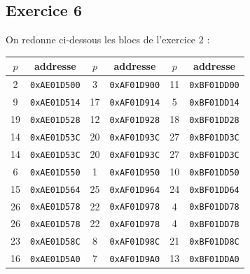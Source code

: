 \documentclass[11pt, a4 paper]{article}
\begin{document}
\subsection{Exercice 6}
On redonne ci-dessous les blocs de l'exercice 2 :\\
\begin{center}
    \begin{tabular}{| c | c || c | c || c | c |}
        \rowcolor{lightgrey}
        \hline
        $p$ & addresse & $p$ & addresse & $p$ & addresse \\
        \hline
        \hline
        \rowcolor{lightgreen}
        2 & \texttt{0xAE01D500} & 3 & \texttt{0xAF01D900} & 11 & \texttt{0xBF01DD00} \\
        \hline
        \rowcolor{lightgreen}
        9 & \texttt{0xAE01D514} & 17 & \texttt{0xAF01D914} & 5 & \texttt{0xBF01DD14} \\
        \hline
        \rowcolor{lightgreen}
        19 & \texttt{0xAE01D528} & 12 & \texttt{0xAF01D928} & 18 & \texttt{0xBF01DD28} \\
        \hline
        \rowcolor{lightgreen}
        14 & \texttt{0xAE01D53C} & 20 & \texttt{0xAF01D93C} & 27 & \texttt{0xBF01DD3C} \\
        \hline
        \hline
        \rowcolor{lightblue}
        14 & \texttt{0xAE01D53C} & 20 & \texttt{0xAF01D93C} & 27 & \texttt{0xBF01DD3C} \\
        \hline
        \rowcolor{lightblue}
        6 & \texttt{0xAE01D550} & 1 & \texttt{0xAF01D950} & 10 & \texttt{0xBF01DD50} \\
        \hline
        \rowcolor{lightblue}
        15 & \texttt{0xAE01D564} & 25 & \texttt{0xAF01D964} & 24 & \texttt{0xBF01DD64}\\
        \hline
        \rowcolor{lightblue}
        26 & \texttt{0xAE01D578} & 22 & \texttt{0xAF01D978} & 4 & \texttt{0xBF01DD78}\\
        \hline
        \hline
        \rowcolor{lightred}
        26 & \texttt{0xAE01D578} & 22 & \texttt{0xAF01D978} & 4 & \texttt{0xBF01DD78}\\
        \hline
        \rowcolor{lightred}
        23 & \texttt{0xAE01D58C} & 8 & \texttt{0xAF01D98C} & 21 & \texttt{0xBF01DD8C}\\
        \hline
        \rowcolor{lightred}
        16 & \texttt{0xAE01D5A0} & 7 & \texttt{0xAF01D9A0} & 13 & \texttt{0xBF01DDA0}\\
        \hline
    \end{tabular}
\end{center}
\end{document}
